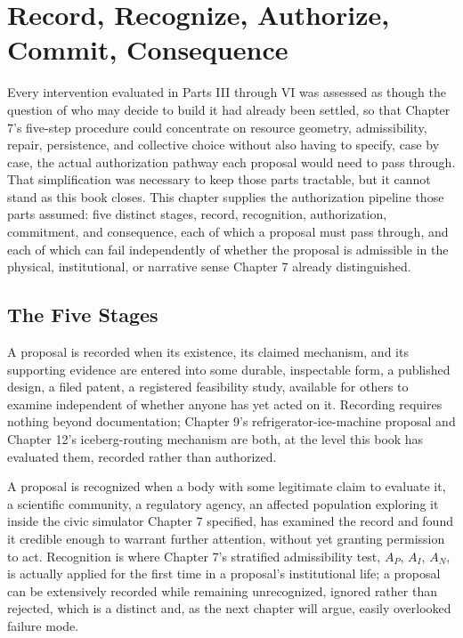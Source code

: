 \documentclass[11pt,oneside]{book}
\begin{document}
\chapter{Record, Recognize, Authorize, Commit, Consequence}

Every intervention evaluated in Parts III through VI was assessed as though the question of who may decide to build it had already been settled, so that Chapter 7's five-step procedure could concentrate on resource geometry, admissibility, repair, persistence, and collective choice without also having to specify, case by case, the actual authorization pathway each proposal would need to pass through. That simplification was necessary to keep those parts tractable, but it cannot stand as this book closes. This chapter supplies the authorization pipeline those parts assumed: five distinct stages, record, recognition, authorization, commitment, and consequence, each of which a proposal must pass through, and each of which can fail independently of whether the proposal is admissible in the physical, institutional, or narrative sense Chapter 7 already distinguished.

\section*{The Five Stages}

A proposal is recorded when its existence, its claimed mechanism, and its supporting evidence are entered into some durable, inspectable form, a published design, a filed patent, a registered feasibility study, available for others to examine independent of whether anyone has yet acted on it. Recording requires nothing beyond documentation; Chapter 9's refrigerator-ice-machine proposal and Chapter 12's iceberg-routing mechanism are both, at the level this book has evaluated them, recorded rather than authorized.

A proposal is recognized when a body with some legitimate claim to evaluate it, a scientific community, a regulatory agency, an affected population exploring it inside the civic simulator Chapter 7 specified, has examined the record and found it credible enough to warrant further attention, without yet granting permission to act. Recognition is where Chapter 7's stratified admissibility test, $A_P$, $A_I$, $A_N$, is actually applied for the first time in a proposal's institutional life; a proposal can be extensively recorded while remaining unrecognized, ignored rather than rejected, which is a distinct and, as the next chapter will argue, easily overlooked failure mode.
\end{document}
